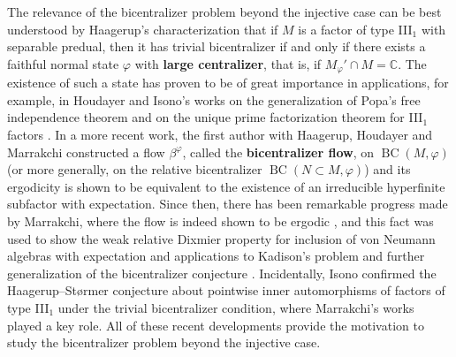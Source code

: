 \documentclass[12pt]{amsart}
\theoremstyle{definition}
\newcommand{\C}{\mathbb{C}}
\def\BC{\operatorname{BC}}
\begin{document}
The relevance of the bicentralizer problem beyond the injective case can be best understood by Haagerup's characterization \cite[Theorem 3.1]{haagerup87} that if $M$ is a factor of type III$_1$ with separable predual, then it has trivial bicentralizer if and only if there exists a faithful normal state $\varphi$ with \textbf{large centralizer}, that is, if $M_{\varphi}'\cap M=\C$. The existence of such a state has proven to be of great importance in applications, for example, in Houdayer and Isono's works on the generalization of Popa's free independence theorem \cite{HoudayerIsono15freeindependence} and on the unique prime factorization theorem for III$_1$ factors \cite{houdayerisono17prime}. In a more recent work, the first author with Haagerup, Houdayer and Marrakchi \cite{AHHM20} constructed a flow $\beta^{\varphi}$, called the \textbf{bicentralizer flow}, on $\BC(M,\varphi)$ (or more generally, on the relative bicentralizer $\BC(N\subset M,\varphi)$) and its ergodicity is shown to be equivalent to the existence of an irreducible hyperfinite subfactor with expectation. Since then, there has been remarkable progress made by Marrakchi, where the flow is indeed shown to be ergodic \cite{Marrakchi20}, and this fact was used to show the weak relative Dixmier property for inclusion of von Neumann algebras with expectation \cite{Marrakchi21Dixmier} and applications to Kadison's problem and further generalization of the bicentralizer conjecture \cite{Marrakchi25Kadison}. Incidentally, Isono \cite{Isono24} confirmed the Haagerup--St\o rmer conjecture \cite{HaagerupStormer90,HaagerupStormer90pointwise,HaagerupStormer94pointwise} about pointwise inner automorphisms of factors of type III$_1$ under the trivial bicentralizer condition, where Marrakchi's works played a key role. All of these recent developments provide the motivation to study the bicentralizer problem beyond the injective case.    
\end{document}
